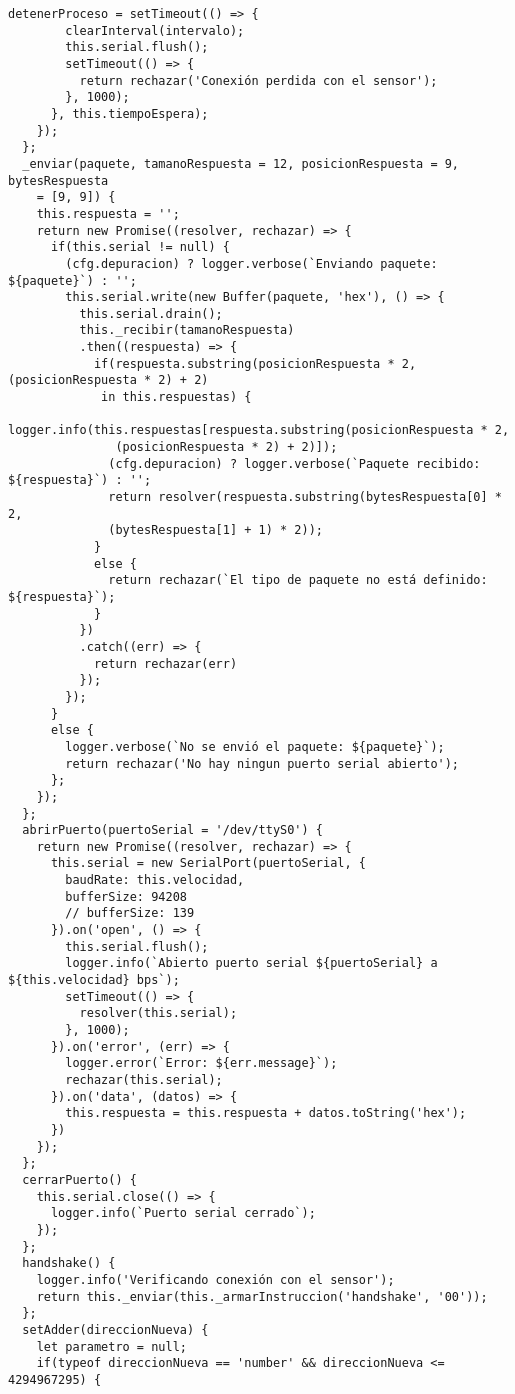 \begin{lstlisting}[label=anx:libreria_zfm20]
      detenerProceso = setTimeout(() => {
        clearInterval(intervalo);
        this.serial.flush();
        setTimeout(() => {
          return rechazar('Conexión perdida con el sensor');
        }, 1000);
      }, this.tiempoEspera);
    });
  };
  _enviar(paquete, tamanoRespuesta = 12, posicionRespuesta = 9, bytesRespuesta 
    = [9, 9]) {
    this.respuesta = '';
    return new Promise((resolver, rechazar) => {
      if(this.serial != null) {
        (cfg.depuracion) ? logger.verbose(`Enviando paquete: ${paquete}`) : '';
        this.serial.write(new Buffer(paquete, 'hex'), () => {
          this.serial.drain();
          this._recibir(tamanoRespuesta)
          .then((respuesta) => {
            if(respuesta.substring(posicionRespuesta * 2, (posicionRespuesta * 2) + 2)
             in this.respuestas) {
              logger.info(this.respuestas[respuesta.substring(posicionRespuesta * 2,
               (posicionRespuesta * 2) + 2)]);
              (cfg.depuracion) ? logger.verbose(`Paquete recibido: ${respuesta}`) : '';
              return resolver(respuesta.substring(bytesRespuesta[0] * 2,
              (bytesRespuesta[1] + 1) * 2));
            }
            else {
              return rechazar(`El tipo de paquete no está definido: ${respuesta}`);
            }
          })
          .catch((err) => {
            return rechazar(err)
          });
        });
      }
      else {
        logger.verbose(`No se envió el paquete: ${paquete}`);
        return rechazar('No hay ningun puerto serial abierto');
      };
    });
  };
  abrirPuerto(puertoSerial = '/dev/ttyS0') {
    return new Promise((resolver, rechazar) => {
      this.serial = new SerialPort(puertoSerial, {
        baudRate: this.velocidad,
        bufferSize: 94208
        // bufferSize: 139
      }).on('open', () => {
        this.serial.flush();
        logger.info(`Abierto puerto serial ${puertoSerial} a ${this.velocidad} bps`);
        setTimeout(() => {
          resolver(this.serial);
        }, 1000);
      }).on('error', (err) => {
        logger.error(`Error: ${err.message}`);
        rechazar(this.serial);
      }).on('data', (datos) => {
        this.respuesta = this.respuesta + datos.toString('hex');
      })
    });
  };
  cerrarPuerto() {
    this.serial.close(() => {
      logger.info(`Puerto serial cerrado`);
    });
  };
  handshake() {
    logger.info('Verificando conexión con el sensor');
    return this._enviar(this._armarInstruccion('handshake', '00'));
  };
  setAdder(direccionNueva) {
    let parametro = null;
    if(typeof direccionNueva == 'number' && direccionNueva <= 4294967295) {

\end{lstlisting}
